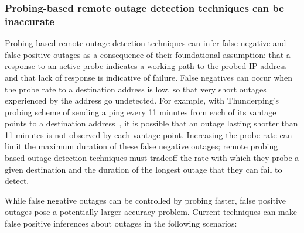 \subsubsection{Probing-based remote outage detection techniques can
be inaccurate}


Probing-based remote outage detection techniques can infer false
negative and false positive outages as a consequence of their foundational
assumption: that a response to an active probe indicates a working path to the probed
IP address and that lack of response is indicative of
failure. False negatives can occur when the probe rate
to a destination address is low, so that very short outages
experienced by the address go undetected. For example, with
Thunderping's probing scheme of sending a ping every 11 minutes from
each of its vantage points to a destination address~\cite{pingin}, it is possible that an outage lasting
shorter than 11 minutes is not observed by each vantage
point. Increasing the probe rate can limit the maximum duration
of these false negative outages; remote probing based outage detection
techniques must tradeoff the rate
with which they probe a given destination and the duration of the
longest outage that they can fail to detect. 

While false negative outages can be controlled by probing faster,
false positive outages pose a potentially larger accuracy problem. Current
techniques can make false positive inferences about
outages in the following scenarios:

